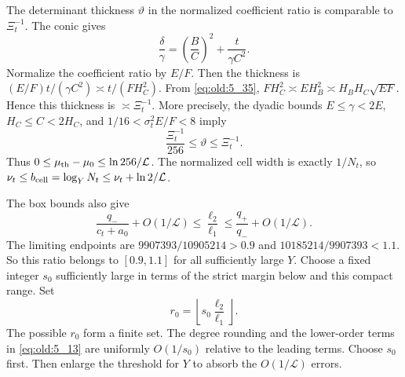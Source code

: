 The determinant thickness \(\vartheta\) in the normalized coefficient
ratio is comparable to \(\Xi_t^{-1}\). The conic gives
\[
 \frac{\delta}{\gamma}
 =\left(\frac BC\right)^2+\frac{t}{\gamma C^2}.
\]
Normalize the coefficient ratio by \(E/F\). Then the thickness is
\((E/F)t/(\gamma C^2)\asymp t/(F H_C^2)\). From \eqref{eq:old:5_35},
\(F H_C^2\asymp E H_B^2\asymp H_BH_C\sqrt{EF}\). Hence this thickness is
\(\asymp \Xi_t^{-1}\). More precisely, the dyadic bounds
\(E\le\gamma<2E\), \(H_C\le C<2H_C\), and
\(1/16<\sigma_t^2E/F<8\) imply
\[
 \frac{\Xi_t^{-1}}{256}\le\vartheta\le\Xi_t^{-1}.
\]
Thus \(0\le\mu_{\rm th}-\mu_0\le\ln256/\mathcal L\). The normalized
cell width is exactly \(1/N_t\), so
\(\nu_t\le b_{\rm cell}=\log_Y N_t\le\nu_t+\ln2/\mathcal L\).

The box bounds also give
\[
 \frac{q_-}{c_t+a_0}+O(1/\mathcal L)
 \le\frac{\ell_2}{\ell_1}
 \le\frac{q_+}{q_-}+O(1/\mathcal L).
\]
The limiting endpoints are \(9907393/10905214>0.9\) and
\(10185214/9907393<1.1\). So this ratio belongs to \([0.9,1.1]\) for
all sufficiently large \(Y\). Choose a fixed integer \(s_0\)
sufficiently large in terms of the strict margin below and this compact
range. Set
\[
 r_0=\left\lfloor s_0\frac{\ell_2}{\ell_1}\right\rfloor .
\]
The possible \(r_0\) form a finite set. The degree rounding and the
lower-order terms in \eqref{eq:old:5_13} are uniformly \(O(1/s_0)\) relative to the
leading terms. Choose \(s_0\) first. Then enlarge the threshold for \(Y\)
to absorb the \(O(1/\mathcal L)\) errors.

